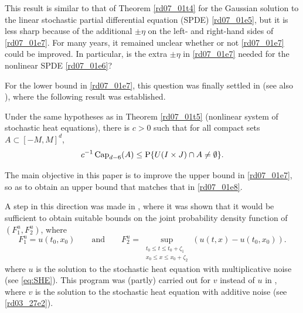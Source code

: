 \documentclass[12pt,a4paper]{article}
\renewcommand{\P}{\mathrm{P}}
\newcommand{\<}{\langle}
\renewcommand{\>}{\rangle}
\begin{document}
This result is similar to that of Theorem \ref{rd07_01t4} for the Gaussian solution to the linear stochastic partial differential equation (SPDE) \eqref{rd07_01e5}, but it is less sharp because of the additional $\pm \eta$ on the left- and right-hand sides of \eqref{rd07_01e7}. For many years, it remained unclear whether or not \eqref{rd07_01e7} could be improved. In particular, is the extra $\pm \eta$ in \eqref{rd07_01e7} needed for the nonlinear SPDE \eqref{rd07_01e6}?

For the lower bound in  \eqref{rd07_01e7}, this question was finally settled in \cite{FP} (see also \cite{DP1}), where the following result was established.

\begin{theorem}\label{rd07_01t6} 
Under the same hypotheses as in Theorem \ref{rd07_01t5} (nonlinear system of stochastic heat equations), there is $c>0$ such that for all compact sets $A \subset [-M, M]^d$, 
\begin{equation}\label{rd07_01e9}
c^{-1} \,  \textnormal{Cap}_{d-6}(A) \leq \P \{ U(I \times J) \cap A \neq
\emptyset \}.
\end{equation}
\end{theorem}

The main objective in this paper is to improve the upper bound in \eqref{rd07_01e7}, so as to obtain an upper bound that matches that in \eqref{rd07_01e8}.

A step in this direction was made in \cite[Chapter 4]{FP}, where it was shown that it would be sufficient to obtain suitable bounds on the joint probability density function of $(F_1^u, F_2^u)$,
where
\begin{equation*}
   F_1^u=u(t_0,x_0)\qquad\text{and}\qquad F_2^u=  \sup _{\substack {t_0\le t \le t_0+\zeta_1 \\ x_0\le x \le x_0+\zeta_2}}
(u(t,x)-u(t_0,x_0)).
\end{equation*}
where $u$ is the solution to the stochastic heat equation with multiplicative noise (see \eqref{eq:SHE}).
This program was (partly) carried out for $v$ instead of $u$ in \cite{DP1}, where $v$ is the solution to the stochastic heat equation with additive noise (see \eqref{rd03_27e2}). 
\end{document}
